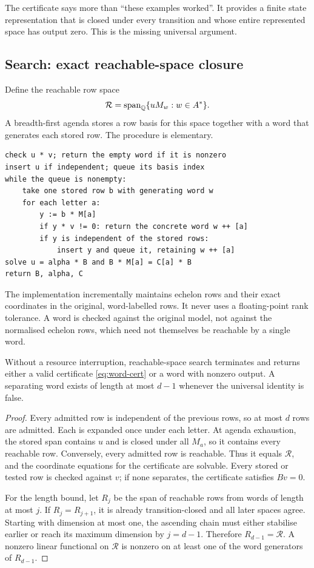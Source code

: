 The certificate says more than ``these examples worked''. It provides a finite
state representation that is closed under every transition and whose entire
represented space has output zero. This is the missing universal argument.

\subsection{Search: exact reachable-space closure}

Define the reachable row space
\[
\mathcal R=\operatorname{span}_\mathbb Q\{uM_w:w\in A^*\}.
\]
A breadth-first agenda stores a row basis for this space together with a word
that generates each stored row. The procedure is elementary.

\begin{lstlisting}
check u * v; return the empty word if it is nonzero
insert u if independent; queue its basis index
while the queue is nonempty:
    take one stored row b with generating word w
    for each letter a:
        y := b * M[a]
        if y * v != 0: return the concrete word w ++ [a]
        if y is independent of the stored rows:
            insert y and queue it, retaining w ++ [a]
solve u = alpha * B and B * M[a] = C[a] * B
return B, alpha, C
\end{lstlisting}

The implementation incrementally maintains echelon rows and their exact
coordinates in the original, word-labelled rows. It never uses a floating-point
rank tolerance. A word is checked against the original model, not against the
normalised echelon rows, which need not themselves be reachable by a single
word.

\begin{theorem}
Without a resource interruption, reachable-space search terminates and returns
either a valid certificate \eqref{eq:word-cert} or a word with nonzero output.
A separating word exists of length at most $d-1$ whenever the universal identity
is false.
\end{theorem}
\begin{proof}
Every admitted row is independent of the previous rows, so at most $d$ rows
are admitted. Each is expanded once under each letter. At agenda exhaustion,
the stored span contains $u$ and is closed under all $M_a$, so it contains every
reachable row. Conversely, every admitted row is reachable. Thus it equals
$\mathcal R$, and the coordinate equations for the certificate are solvable.
Every stored or tested row is checked against $v$; if none separates, the
certificate satisfies $Bv=0$.

For the length bound, let $R_j$ be the span of reachable rows from words of
length at most $j$. If $R_j=R_{j+1}$, it is already transition-closed and all
later spaces agree. Starting with dimension at most one, the ascending chain
must either stabilise earlier or reach its maximum dimension by $j=d-1$.
Therefore $R_{d-1}=\mathcal R$. A nonzero linear functional on $\mathcal R$
is nonzero on at least one of the word generators of $R_{d-1}$.
\end{proof}

